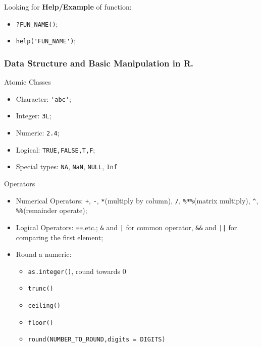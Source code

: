 \begin{point}
    Looking for \textbf{Help/Example}  of function:
\end{point}

\begin{itemize}[topsep=2pt,itemsep=0pt]
    \item \lstinline|?FUN_NAME()|;
    \item \lstinline|help('FUN_NAME')|;
\end{itemize}

\subsubsection{Data Structure and Basic Manipulation in R.}

\begin{point}
    Atomic Classes
\end{point}
\begin{itemize}[topsep=2pt,itemsep=0pt]
    \item Character: \lstinline|'abc'|;
    \item Integer: \lstinline|3L|;
    \item Numeric: \lstinline|2.4|;
    \item Logical: \lstinline|TRUE,FALSE,T,F|;
    \item Special types: \lstinline|NA|, \lstinline|NaN|, \lstinline|NULL|, \lstinline|Inf|
\end{itemize}

\begin{point}
    Operators
\end{point}
\begin{itemize}[topsep=2pt,itemsep=0pt]
    \item Numerical Operators: \lstinline|+|, \lstinline|-|, \lstinline|*|(multiply by column), \lstinline|/|, \lstinline|%*%|(matrix multiply), \lstinline|^|, \lstinline|%%|(remainder operate);
    \item Logical Operators: \lstinline|==|,etc.; \lstinline|&| and \lstinline{|} for common operator, \lstinline|&&| and \lstinline{||} for comparing the first element;
    \item Round a numeric:
    \begin{itemize}[topsep=2pt,itemsep=0pt]
        \item \lstinline|as.integer()|, round towards 0
        \item \lstinline|trunc()|
        \item \lstinline|ceiling()|
        \item \lstinline|floor()|
        \item \lstinline|round(NUMBER_TO_ROUND,digits = DIGITS)|
    \end{itemize}
\end{itemize}

